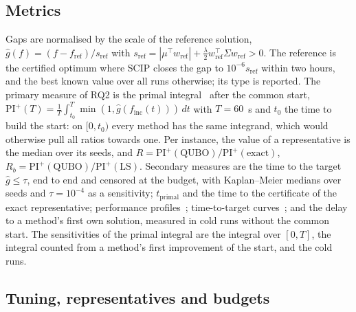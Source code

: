 \subsection{Metrics}\label{sec:metrics}

Gaps are normalised by the scale of the reference solution,
$\hat g(f) = (f - f_{\mathrm{ref}})/s_{\mathrm{ref}}$ with
$s_{\mathrm{ref}} = |\mu^{\top}w_{\mathrm{ref}}| + \frac{\lambda}{2} w_{\mathrm{ref}}^{\top}\Sigma w_{\mathrm{ref}} > 0$.
The reference is the certified optimum where SCIP closes the gap to $10^{-6} s_{\mathrm{ref}}$ within two hours, and the
best known value over all runs otherwise; its type is reported. The primary measure of RQ2 is the primal
integral~\cite{berthold2013measuring} after the common start,
$\mathrm{PI}^{+}(T) = \frac{1}{T}\int_{t_0}^{T} \min(1, \hat g(f_{\mathrm{inc}}(t)))\, dt$ with $T = 60$~s and $t_0$
the time to build the start: on $[0, t_0)$ every method has the same integrand, which would otherwise pull all ratios
towards one. Per instance, the value of a representative is the median over its seeds, and
$R = \mathrm{PI}^{+}(\text{QUBO})/\mathrm{PI}^{+}(\text{exact})$, $R_b = \mathrm{PI}^{+}(\text{QUBO})/\mathrm{PI}^{+}(\text{LS})$.
Secondary measures are the time to the target $\hat g \le \tau$, end to end and censored at the budget, with
Kaplan--Meier medians over seeds and $\tau = 10^{-4}$ as a sensitivity; $t_{\mathrm{primal}}$ and the time to the
certificate of the exact representative; performance profiles~\cite{dolan2002benchmarking}; time-to-target
curves~\cite{aiex2006ttt}; and the delay to a method's first own solution, measured in cold runs without the common
start. The sensitivities of the primal integral are the integral over $[0, T]$, the integral counted from a method's
first improvement of the start, and the cold runs.

\subsection{Tuning, representatives and budgets}\label{sec:tuning}

